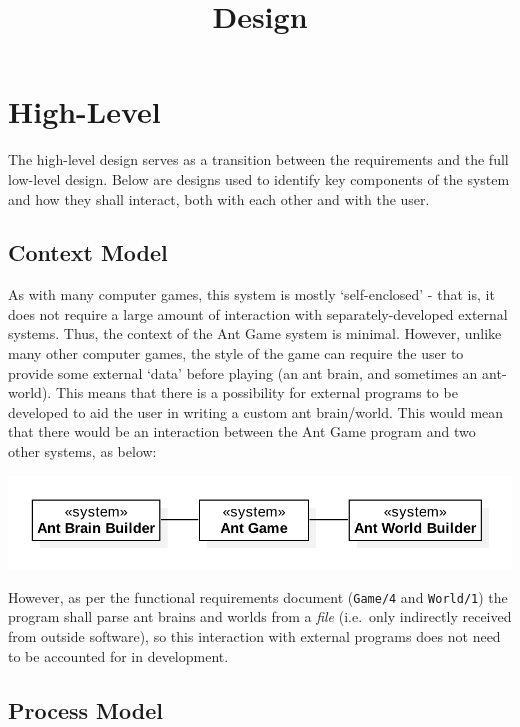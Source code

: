 \documentclass[11pt]{article}
\title{Design}
\date{}
\begin{document}
\maketitle
\tableofcontents
\newpage

\section{High-Level}\label{high-level}

The high-level design serves as a transition between the requirements
and the full low-level design. Below are designs used to identify key
components of the system and how they shall interact, both with each
other and with the user.

\subsection{Context Model}\label{context-model}

As with many computer games, this system is mostly `self-enclosed' -
that is, it does not require a large amount of interaction with
separately-developed external systems. Thus, the context of the Ant Game
system is minimal. However, unlike many other computer games, the style
of the game can require the user to provide some external `data' before
playing (an ant brain, and sometimes an ant-world). This means that
there is a possibility for external programs to be developed to aid the
user in writing a custom ant brain/world. This would mean that there
would be an interaction between the Ant Game program and two other
systems, as below:

\begin{center}
\includegraphics{diagrams/context-model.png}
\end{center}

However, as per the functional requirements document (\texttt{Game/4}
and \texttt{World/1}) the program shall parse ant brains and worlds from
a \emph{file} (i.e.~only indirectly received from outside software), so
this interaction with external programs does not need to be accounted
for in development.

\subsection{Process Model}\label{process-model}
\end{document}
